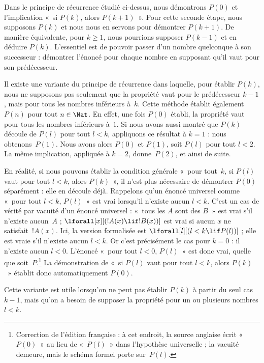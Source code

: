 \documentclass[../../../include/open-logic-section]{subfiles}
\begin{document}


Dans le principe de récurrence
étudié ci-dessus, nous
démontrons $P(0)$ et
l'implication
«~si $P(k)$, alors
$P(k+1)$~». Pour cette
seconde étape, nous
supposons $P(k)$ et
nous nous en servons
pour démontrer $P(k+1)$.
De manière équivalente,
pour $k\ge1$, nous
pourrions supposer
$P(k-1)$ et en
déduire $P(k)$.
L'essentiel est de
pouvoir passer d'un
nombre quelconque
à son successeur :
démontrer l'énoncé
pour chaque nombre
en supposant qu'il
vaut pour son
prédécesseur.

Il existe une variante
du principe de récurrence
dans laquelle, pour
établir $P(k)$,
nous ne supposons pas
seulement que la
propriété vaut pour
le prédécesseur
$k-1$, mais pour
tous les
nombres inférieurs
à~$k$. Cette méthode
établit également
$P(n)$ pour tout
$n \in \Nat$.
En effet, une fois
$P(0)$ établi,
la propriété vaut
pour tous les
nombres inférieurs
à~$1$. Si nous
avons aussi montré
que $P(k)$ découle
de $P(l)$ pour
tout $l<k$,
appliquons ce
résultat à $k=1$ :
nous obtenons~$P(1)$.
Nous avons alors
$P(0)$ et $P(1)$,
soit $P(l)$ pour
tout $l<2$.
La même implication,
appliquée à $k=2$,
donne~$P(2)$,
et ainsi de suite.

En réalité, si nous
pouvons établir la
condition générale
«~pour tout~$k$,
si $P(l)$ vaut
pour tout $l<k$,
alors $P(k)$~»,
il n'est plus
nécessaire de
démontrer $P(0)$
séparément : elle
en découle déjà.
Rappelons qu'un
énoncé universel
comme «~pour tout
$l<k$, $P(l)$~»
est vrai lorsqu'il
n'existe aucun
$l<k$. C'est
un cas de vérité
par vacuité d'un
énoncé universel :
«~tous les $A$
sont des $B$~»
est vrai s'il
n'existe aucun~$A$ ;
$\lforall[x][(!A(x) \lif !B(x))]$
est vrai si aucun
$x$ ne satisfait~$!A(x)$.
Ici, la version
formalisée est
$\lforall[l][(l < k \lif P(l))]$ ;
elle est vraie
s'il n'existe
aucun $l<k$.
Or c'est précisément
le cas pour $k=0$ :
il n'existe aucun
$l<0$. L'énoncé
«~pour tout
$l<0$, $P(l)$~»
est donc vrai,
quelle que soit~$P$.\footnote{
Correction de l'édition française :
à cet endroit, la source anglaise
écrit «~$P(0)$~» au lieu de
«~$P(l)$~» dans l'hypothèse
universelle ; la vacuité
demeure, mais le schéma
formel porte sur~$P(l)$.}
La démonstration
de «~si $P(l)$
vaut pour tout
$l<k$, alors
$P(k)$~» établit
donc automatiquement
$P(0)$.

Cette variante est
utile lorsqu'on
ne peut pas établir
$P(k)$ à partir
du seul cas $k-1$,
mais qu'on a besoin
de supposer la
propriété pour
un ou plusieurs
nombres $l<k$.
\end{document}
